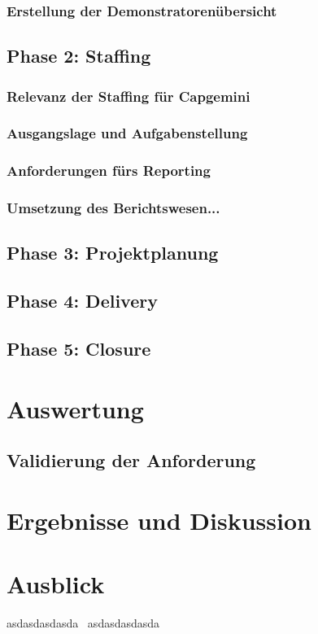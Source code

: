 \documentclass[a4paper, 12pt]{scrartcl}
\begin{document}
	\subsubsection{Erstellung der Demonstratorenübersicht}
	\newpage
	\subsection{Phase 2: Staffing}
	\subsubsection{Relevanz der Staffing für Capgemini}%
	\subsubsection{Ausgangslage und Aufgabenstellung}
	\subsubsection{Anforderungen fürs Reporting}
	\subsubsection{Umsetzung des Berichtswesen...}
	\newpage
	\subsection{Phase 3: Projektplanung}
	\newpage
	\subsection{Phase 4: Delivery}
	\newpage
	\subsection{Phase 5: Closure}
	\newpage
	\section{Auswertung}
	\subsection{Validierung der Anforderung}%
	\newpage
	\section{Ergebnisse und Diskussion}
		\newpage
	\section{Ausblick}
	asdasdasdasda~\cite{karmasin2017gestaltung}
	asdasdasdasda~\cite{prevezanos2013technisches }
		\newpage
\end{document}
